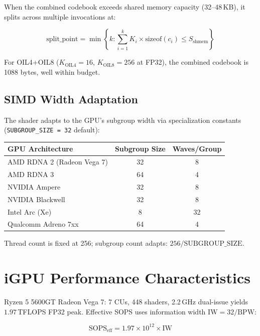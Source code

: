 When the combined codebook exceeds shared memory capacity (32--48\,KB), it
splits across multiple invocations at:

\begin{equation}
\label{eq:codebook_split}
\mathrm{split\_point} = \min\left\{ k :
\sum_{i=1}^{k} K_i \times \mathrm{sizeof}(c_i)
\leq S_{\mathrm{shmem}} \right\}
\end{equation}

For OIL4+OIL8 ($K_{\mathrm{OIL4}} = 16$, $K_{\mathrm{OIL8}} = 256$ at FP32),
the combined codebook is 1088 bytes, well within budget.

\subsection{SIMD Width Adaptation}

The shader adapts to the GPU's subgroup width via specialization constants
(\texttt{SUBGROUP\_SIZE = 32} default):

\begin{longtable}{lcc}
\toprule
\textbf{GPU Architecture} & \textbf{Subgroup Size} & \textbf{Waves/Group} \\
\midrule
\endhead
AMD RDNA 2 (Radeon Vega 7) & 32 & 8 \\
AMD RDNA 3 & 64 & 4 \\
NVIDIA Ampere & 32 & 8 \\
NVIDIA Blackwell & 32 & 8 \\
Intel Arc (Xe) & 8 & 32 \\
Qualcomm Adreno 7xx & 64 & 4 \\
\bottomrule
\end{longtable}

Thread count is fixed at 256; subgroup count adapts: $256 / \mathrm{SUBGROUP\_SIZE}$.

\section{iGPU Performance Characteristics}
\label{sec:igpu_perf}

Ryzen 5 5600GT Radeon Vega 7: 7 CUs, 448 shaders, 2.2\,GHz dual-issue yields
$1.97$\,TFLOPS FP32 peak. Effective SOPS uses information width $\mathrm{IW} =
32 / \mathrm{BPW}$:

\begin{equation}
\mathrm{SOPS}_{\mathrm{eff}} = 1.97 \times 10^{12} \times \mathrm{IW}
\end{equation}


